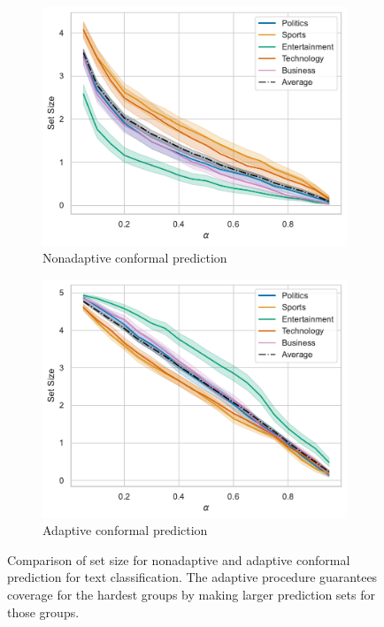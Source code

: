 \documentclass[a4paper, 12pt]{article}
\begin{document}
\begin{figure}[ht]
    \centering
    \begin{subfigure}[b]{0.8\linewidth}
        \includegraphics[width=\linewidth]{figures/nonadaptive_set_size.pdf}
        \caption{Nonadaptive conformal prediction}
        \label{fig:nonadaptive_set_size}
    \end{subfigure}
    \begin{subfigure}[b]{0.8\linewidth}
        \includegraphics[width=\linewidth]{figures/adaptive_set_size.pdf}
        \caption{Adaptive conformal prediction}
        \label{fig:adaptive_set_size}
    \end{subfigure}
    \caption{Comparison of set size for nonadaptive and adaptive conformal prediction for text classification. The adaptive procedure guarantees coverage for the hardest groups by making larger prediction sets for those groups.}
    \label{fig:conformal_prediction}
\end{figure}



\newpage
\printbibliography %
\end{document}
